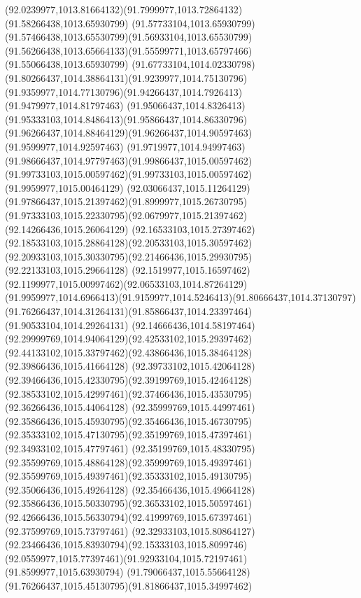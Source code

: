 {{	\curveto(92.0239977,1013.81664132)(91.7999977,1013.72864132)(91.58266438,1013.65930799)
	\curveto(91.57733104,1013.65930799)(91.57466438,1013.65530799)(91.56933104,1013.65530799)
	\curveto(91.56266438,1013.65664133)(91.55599771,1013.65797466)(91.55066438,1013.65930799)
	\curveto(91.67733104,1014.02330798)(91.80266437,1014.38864131)(91.9239977,1014.75130796)
	\curveto(91.9359977,1014.77130796)(91.94266437,1014.7926413)(91.9479977,1014.81797463)
	\curveto(91.95066437,1014.8326413)(91.95333103,1014.8486413)(91.95866437,1014.86330796)
	\curveto(91.96266437,1014.88464129)(91.96266437,1014.90597463)(91.9599977,1014.92597463)
	\curveto(91.9719977,1014.94997463)(91.98666437,1014.97797463)(91.99866437,1015.00597462)
	\curveto(91.99733103,1015.00597462)(91.99733103,1015.00597462)(91.9959977,1015.00464129)
	\curveto(92.03066437,1015.11264129)(91.97866437,1015.21397462)(91.8999977,1015.26730795)
	\curveto(91.97333103,1015.22330795)(92.0679977,1015.21397462)(92.14266436,1015.26064129)
	\curveto(92.16533103,1015.27397462)(92.18533103,1015.28864128)(92.20533103,1015.30597462)
	\curveto(92.20933103,1015.30330795)(92.21466436,1015.29930795)(92.22133103,1015.29664128)
	\curveto(92.1519977,1015.16597462)(92.1199977,1015.00997462)(92.06533103,1014.87264129)
	\curveto(91.9959977,1014.6966413)(91.9159977,1014.5246413)(91.80666437,1014.37130797)
	\curveto(91.76266437,1014.31264131)(91.85866437,1014.23397464)(91.90533104,1014.29264131)
	\curveto(92.14666436,1014.58197464)(92.29999769,1014.94064129)(92.42533102,1015.29397462)
	\curveto(92.44133102,1015.33797462)(92.43866436,1015.38464128)(92.39866436,1015.41664128)
	\curveto(92.39733102,1015.42064128)(92.39466436,1015.42330795)(92.39199769,1015.42464128)
	\curveto(92.38533102,1015.42997461)(92.37466436,1015.43530795)(92.36266436,1015.44064128)
	\curveto(92.35999769,1015.44997461)(92.35866436,1015.45930795)(92.35466436,1015.46730795)
	\curveto(92.35333102,1015.47130795)(92.35199769,1015.47397461)(92.34933102,1015.47797461)
	\curveto(92.35199769,1015.48330795)(92.35599769,1015.48864128)(92.35999769,1015.49397461)
	\curveto(92.35599769,1015.49397461)(92.35333102,1015.49130795)(92.35066436,1015.49264128)
	\curveto(92.35466436,1015.49664128)(92.35866436,1015.50330795)(92.36533102,1015.50597461)
	\curveto(92.42666436,1015.56330794)(92.41999769,1015.67397461)(92.37599769,1015.73797461)
	\curveto(92.32933103,1015.80864127)(92.23466436,1015.83930794)(92.15333103,1015.8099746)
	\curveto(92.0559977,1015.77397461)(91.92933104,1015.72197461)(91.8599977,1015.63930794)
	\curveto(91.79066437,1015.55664128)(91.76266437,1015.45130795)(91.81866437,1015.34997462)
}}
